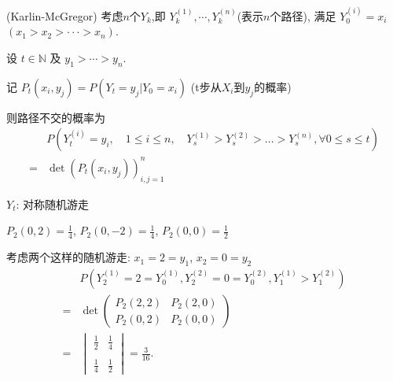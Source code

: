 \begin{theorem}{(Karlin-McGregor)}
    考虑$n$个$Y_k$,即 $Y_{k}^{(1)}, \cdots, Y_{k}^{(n)}$(表示$n$个路径), 满足 $Y_{0}^{(i)}=x_i$
$(x_{1}>x_{2}>\cdot\cdot\cdot>x_{n})$.

设 $t \in \mathbb{N}$ 及 $y_1 > \cdots > y_n$.

记 $P_{t}(x_{i},y_{j})=P(Y_{t}=y_{j}|Y_{0}=x_{i})$ (t步从$X_i$到$y_j$的概率)

则路径不交的概率为
\begin{equation*}
    \begin{aligned}
        &P(Y_{t}^{(i)}=y_i, \quad 1\leq i\leq n, \quad Y_{s}^{(1)}>Y_{s}^{(2)}>...>Y_{s}^{(n)}, \forall 0\le s\le t)\\
        =&\det(P_{t}(x_{i},y_{j}))_{i,j=1}^{n}
    \end{aligned}
\end{equation*}

\end{theorem}

\begin{example}
    $Y_t$: 对称随机游走

    $P_{2}(0,2)=\frac{1}{4}$, $P_{2}(0,-2)=\frac{1}{4}$, $P_{2}(0,0)=\frac{1}{2}$
    
考虑两个这样的随机游走: $x_{1}=2=y_1$, $x_2=0=y_2$
\begin{equation*}
    \begin{aligned}
        &P(Y_{2}^{(1)}=2=Y_0^{(1)}, Y_{2}^{(2)}=0=Y_0^{(2)}, Y_1^{(1)} > Y_1^{(2)} )\\
        =& \det \begin{pmatrix} P_2(2,2) & P_2(2,0) \\ P_2(0,2) & P_2(0,0) \end{pmatrix}\\
        =&\begin{vmatrix} \frac{1}{2} & \frac{1}{4} \\ \\ \frac{1}{4} & \frac{1}{2} \end{vmatrix} = \frac{3}{16}.
    \end{aligned}
\end{equation*}

\end{example}

